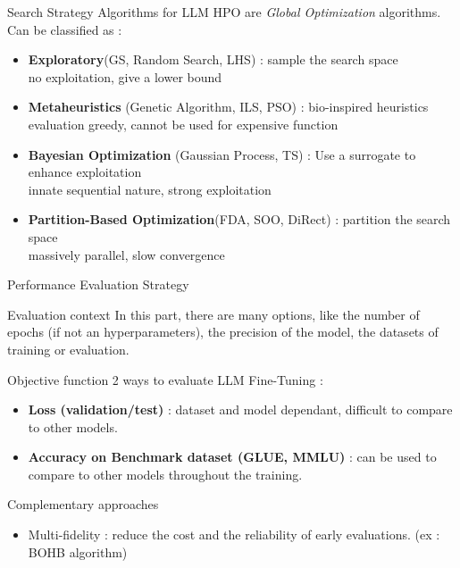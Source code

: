 \begin{frame}{Search Strategy}
    Algorithms for LLM HPO are \textit{Global Optimization} algorithms. Can be classified as : 

    \begin{itemize}
        \item \textbf{Exploratory}(GS, Random Search, LHS) : sample the search space\\ \quad no exploitation, give a lower bound
        \item \textbf{Metaheuristics} (Genetic Algorithm, ILS, PSO) : bio-inspired heuristics \\ \quad evaluation greedy, cannot be used for expensive function
        \item \textbf{Bayesian Optimization} (Gaussian Process, TS) : Use a surrogate to enhance exploitation \\ \quad innate sequential nature, strong exploitation
        \item \textbf{Partition-Based Optimization}(FDA, SOO, DiRect) : partition the search space \\ \quad massively parallel, slow convergence
    \end{itemize}


\end{frame}


\begin{frame}{Performance Evaluation Strategy}
    \begin{block}{Evaluation context}
    In this part, there are many options, like the number of epochs (if not an hyperparameters), the precision of the model, the datasets of training or evaluation. 
        
    \end{block}
    \begin{block}{Objective function}
        2 ways to evaluate LLM Fine-Tuning : 
        \begin{itemize}
            \item \textbf{Loss (validation/test)} : dataset and model dependant, difficult to compare to other models.
            \item \textbf{Accuracy on Benchmark dataset (GLUE, MMLU)} : can be used to compare to other models throughout the training. 
        \end{itemize}
    \end{block}

    \begin{block}{Complementary approaches}
        \begin{itemize}
            \item Multi-fidelity : reduce the cost and the reliability of early evaluations. (ex : BOHB algorithm)
        \end{itemize}
        
    \end{block}
    
\end{frame}